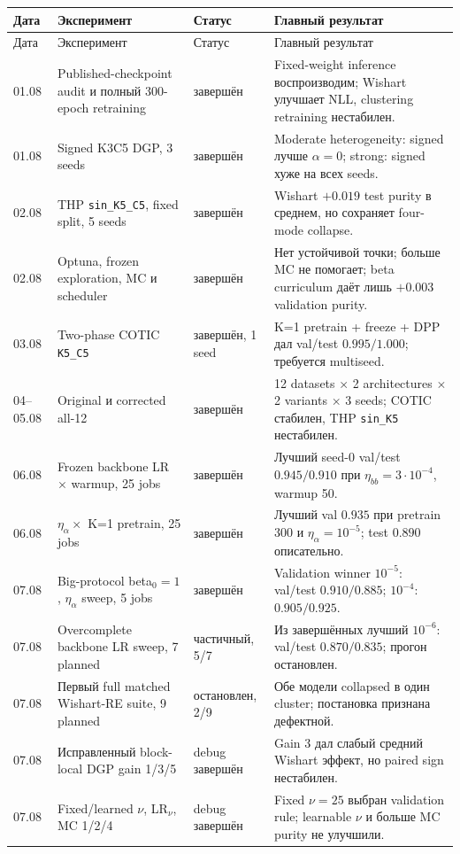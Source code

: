 \documentclass[11pt,a4paper]{article}
\newcommand{\code}[1]{\texttt{#1}}
\begin{document}
\begin{longtable}{p{}p{}p{}p{}}
\toprule
Дата & Эксперимент & Статус & Главный результат \\
\midrule
\endfirsthead
\toprule
Дата & Эксперимент & Статус & Главный результат \\
\midrule
\endhead
01.08 & Published-checkpoint audit и полный 300-epoch retraining & завершён & Fixed-weight inference воспроизводим; Wishart улучшает NLL, clustering retraining нестабилен. \\
01.08 & Signed K3C5 DGP, 3 seeds & завершён & Moderate heterogeneity: signed лучше $\alpha=0$; strong: signed хуже на всех seeds. \\
02.08 & THP \code{sin\_K5\_C5}, fixed split, 5 seeds & завершён & Wishart $+0.019$ test purity в среднем, но сохраняет four-mode collapse. \\
02.08 & Optuna, frozen exploration, MC и scheduler & завершён & Нет устойчивой точки; больше MC не помогает; beta curriculum даёт лишь $+0.003$ validation purity. \\
03.08 & Two-phase COTIC \code{K5\_C5} & завершён, 1 seed & K=1 pretrain + freeze + DPP дал val/test $0.995/1.000$; требуется multiseed. \\
04--05.08 & Original и corrected all-12 & завершён & 12 datasets $\times$ 2 architectures $\times$ 2 variants $\times$ 3 seeds; COTIC стабилен, THP \code{sin\_K5} нестабилен. \\
06.08 & Frozen backbone LR $\times$ warmup, 25 jobs & завершён & Лучший seed-0 val/test $0.945/0.910$ при $\eta_{bb}=3\cdot10^{-4}$, warmup 50. \\
06.08 & $\eta_{\alpha}\times$ K=1 pretrain, 25 jobs & завершён & Лучший val $0.935$ при pretrain 300 и $\eta_{\alpha}=10^{-5}$; test $0.890$ описательно. \\
07.08 & Big-protocol beta$_0=1$, $\eta_{\alpha}$ sweep, 5 jobs & завершён & Validation winner $10^{-5}$: val/test $0.910/0.885$; $10^{-4}$: $0.905/0.925$. \\
07.08 & Overcomplete backbone LR sweep, 7 planned & частичный, 5/7 & Из завершённых лучший $10^{-6}$: val/test $0.870/0.835$; прогон остановлен. \\
07.08 & Первый full matched Wishart-RE suite, 9 planned & остановлен, 2/9 & Обе модели collapsed в один cluster; постановка признана дефектной. \\
07.08 & Исправленный block-local DGP gain 1/3/5 & debug завершён & Gain 3 дал слабый средний Wishart эффект, но paired sign нестабилен. \\
07.08 & Fixed/learned $\nu$, LR$_\nu$, MC 1/2/4 & debug завершён & Fixed $\nu=25$ выбран validation rule; learnable $\nu$ и больше MC purity не улучшили. \\
\bottomrule
\end{longtable}
\end{document}
